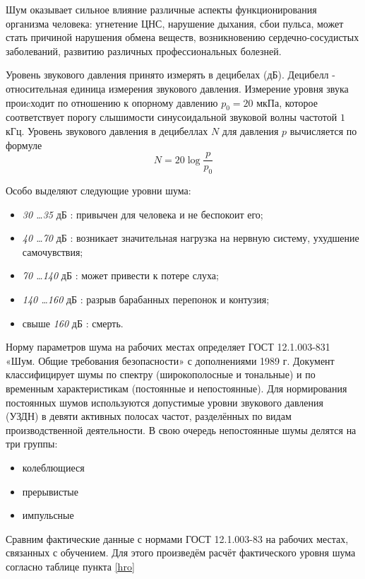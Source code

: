 Шум оказывает сильное влияние различные аспекты функционирования организма человека: угнетение ЦНС, нарушение дыхания, сбои пульса, может стать причиной нарушения обмена веществ, возникновению сердечно-сосу\-дистых заболеваний, развитию различных профессиональных болезней.

Уровень звукового давления принято измерять в децибелах (дБ). Децибелл - отно\-сительная единица измерения звукового давления. Измерение уровня звука проиcходит по отношению к опорному давлению $p_0=20$ мкПа, которое соответствует порогу слы\-шимости синусоидальной звуковой волны частотой $1$ кГц. Уровень звукового давления в децибеллах $N$ для давления $p$ вычисля\-ется по формуле
$$
N = 20 \log \frac{p}{p_0}
$$

Особо выделяют следующие уровни шума:
\begin{itemize}
\item {\itshape 30 \ldots 35} дБ : привычен для человека и не беспокоит его;
\item {\itshape 40 \ldots 70} дБ : возникает значительная нагрузка на нервную систему, ухудшение самочувствия;
\item {\itshape 70 \ldots 140} дБ : может привести к потере слуха;
\item {\itshape 140 \ldots 160} дБ : разрыв барабанных перепонок и контузия;
\item свыше {\itshape  160} дБ : смерть.
\end{itemize}

Норму параметров шума на рабочих местах определяет ГОСТ 12.1.003-831 «Шум. Общие требования безопасности» с дополнениями 1989 г. Документ классифицирует шумы по спектру (широкополосные и тональные) и по вре\-менным характеристикам (постоянные и непостоянные). Для нормирования постоянных шумов используются допустимые уровни звукового давления \\(УЗДН) в девяти активных полосах частот, разделённых по видам произ\-водственной деятельности. В свою очередь непостоянные шумы делятся на три груп\-пы:

\begin{itemize}
\item колеблющиеся
\item прерывистые
\item импульсные
\end{itemize}

Сравним фактические данные с нормами ГОСТ 12.1.003-83 на рабочих местах, связа\-нных с обучением. Для этого произведём расчёт фактического уровня шума согласно таблице пункта \ref{hro}

